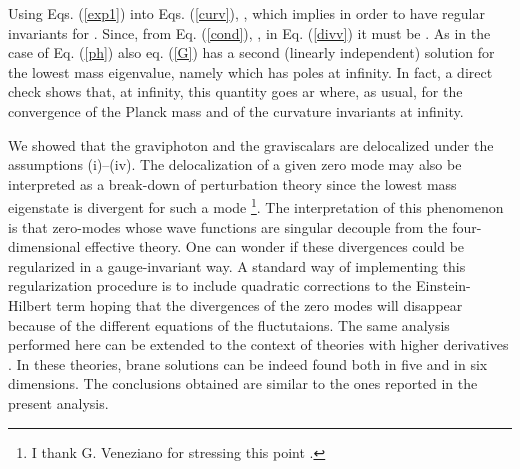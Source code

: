 \documentclass[a4paper,12pt]{article}
\begin{document}
Using Eqs. (\ref{exp1}) into 
Eqs. (\ref{curv}), \coordHE{}, which implies \coordHE{} 
in order to have regular invariants for \coordHE{}.  
Since, from Eq. (\ref{cond}),  \myHighlight{$\beta = 2\alpha$}\coordHE{}, in Eq. (\ref{divv})  
it must be \coordHE{}.
As in the case of Eq. (\ref{ph}) also eq. (\ref{G}) has a second 
(linearly independent) solution for the lowest mass eigenvalue, namely 
\coordHE{} which has poles at infinity.  
In fact, a direct check shows that, at infinity, this quantity
 goes ar \coordHE{} where, as usual, 
\coordHE{} for the convergence of the Planck mass and of the 
curvature invariants at infinity. 

We showed that the graviphoton and the graviscalars are delocalized 
under the assumptions (i)--(iv). The delocalization of a given 
zero mode may also be interpreted as a break-down of perturbation theory
since the lowest mass eigenstate is divergent for such a mode 
\footnote{ I thank G. Veneziano for stressing this point \cite{GV}.}. 
The interpretation of this phenomenon is that zero-modes whose 
wave functions are singular decouple from the four-dimensional 
effective theory. One can wonder if these divergences could be 
regularized in a gauge-invariant way. A standard way of implementing 
this regularization procedure is to include quadratic 
corrections to the Einstein-Hilbert term hoping that 
the divergences of the zero modes will disappear because of the 
different equations of the fluctutaions.
The same analysis performed here can be extended to the context of 
theories with higher derivatives \cite{n3}. In these theories, 
brane solutions can be indeed found both in five \cite{n3,z} 
and in six dimensions\cite{gm,hh}.
The  conclusions obtained are similar to the ones reported in the
present analysis.


\renewcommand{\theequation}{4.\arabic{equation}}
\setcounter{equation}{0}
\end{document}
